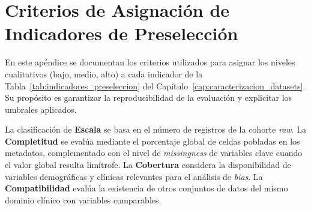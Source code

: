 \chapter{Criterios de Asignación de Indicadores de Preselección}
\label{appendix:criterios_preseleccion}

En este apéndice se documentan los criterios utilizados para asignar los niveles cualitativos (bajo, medio, alto) a cada indicador de la Tabla~\ref{tab:indicadores_preseleccion} del Capítulo~\ref{cap:caracterizacion_datasets}. Su propósito es garantizar la reproducibilidad de la evaluación y explicitar los umbrales aplicados.

La clasificación de \textbf{Escala} se basa en el número de registros de la cohorte \textit{raw}. La \textbf{Completitud} se evalúa mediante el porcentaje global de celdas pobladas en los metadatos, complementado con el nivel de \textit{missingness} de variables clave cuando el valor global resulta limítrofe. La \textbf{Cobertura} considera la disponibilidad de variables demográficas y clínicas relevantes para el análisis de \textit{bias}. La \textbf{Compatibilidad} evalúa la existencia de otros conjuntos de datos del mismo dominio clínico con variables comparables.

